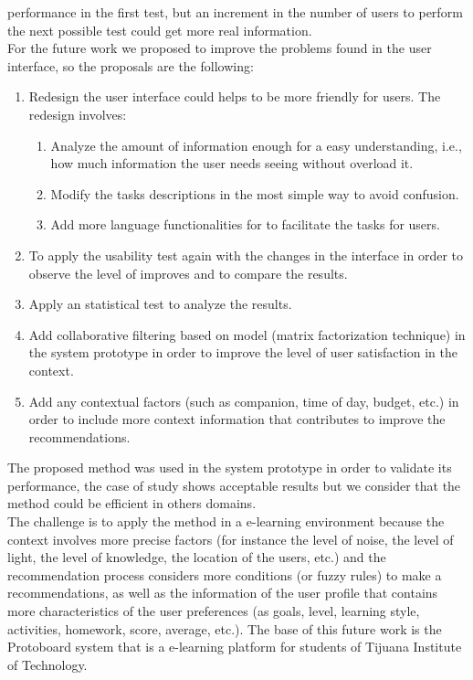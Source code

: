 performance in the first test, but an increment in the number of users
to perform the next possible test could get more real information.\\
For the future work we proposed to improve the problems found 
in the user interface, so the proposals are the following:
\begin{enumerate} 
\item  Redesign the user interface could helps to be more friendly for
users. The redesign involves:
  \begin{enumerate}  
  \item Analyze the amount of information enough for a easy understanding, 
  i.e., how much information the user needs seeing without overload it.
  \item Modify the tasks descriptions in the most simple way to avoid 
  confusion.
  \item Add more language functionalities for to facilitate the tasks 
  for users.
  \end{enumerate}
\item To apply the usability test again with the changes in the interface 
in order to observe the level of improves and to compare the results. 
\item Apply an statistical test to analyze the results.
\item Add collaborative filtering based on model (matrix
factorization technique) in the system prototype in order to improve 
the level of user satisfaction in the context.
\item Add any contextual factors (such as companion, time of day, 
budget, etc.) in order to include more context information that contributes
to improve the recommendations.
\end{enumerate}
The proposed method was used in the system prototype in order to
validate its performance, the case of study shows acceptable results
but we consider that the method could be efficient in others domains.\\ 
The challenge is to apply the method in a e-learning environment
because the context involves more precise factors (for instance the
level of noise, the level of light, the level of knowledge, the location 
of the users, etc.) and the recommendation process considers more 
conditions (or fuzzy rules) to make a recommendations, as well as the information 
of the user profile that contains more characteristics of the user
preferences (as goals, level, learning style, activities, homework,
score, average, etc.). The base of this future work is the Protoboard
system  \cite{garcia2007simple} that is a e-learning platform
for students of Tijuana Institute of Technology.






